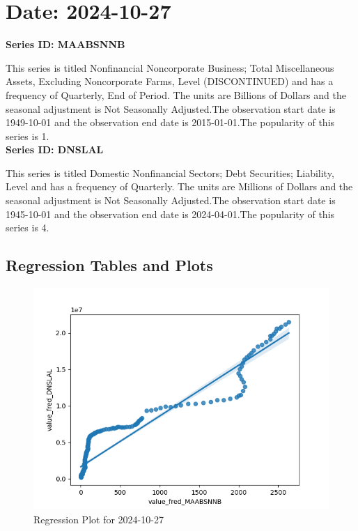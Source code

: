 \section{Date: 2024-10-27}
\noindent \textbf{Series ID: MAABSNNB} 

\noindent This series is titled Nonfinancial Noncorporate Business; Total Miscellaneous Assets, Excluding Noncorporate Farms, Level (DISCONTINUED) and has a frequency of Quarterly, End of Period. The units are Billions of Dollars and the seasonal adjustment is Not Seasonally Adjusted.The observation start date is 1949-10-01 and the observation end date is 2015-01-01.The popularity of this series is 1. \\ 

\noindent \textbf{Series ID: DNSLAL} 

\noindent This series is titled Domestic Nonfinancial Sectors; Debt Securities; Liability, Level and has a frequency of Quarterly. The units are Millions of Dollars and the seasonal adjustment is Not Seasonally Adjusted.The observation start date is 1945-10-01 and the observation end date is 2024-04-01.The popularity of this series is 4. \\ 

\subsection{Regression Tables and Plots}


\begin{figure}
\centering
\includegraphics[scale = 0.9]{plots/plot_2024-10-27.png}
\caption{Regression Plot for 2024-10-27}
\end{figure}
\newpage
